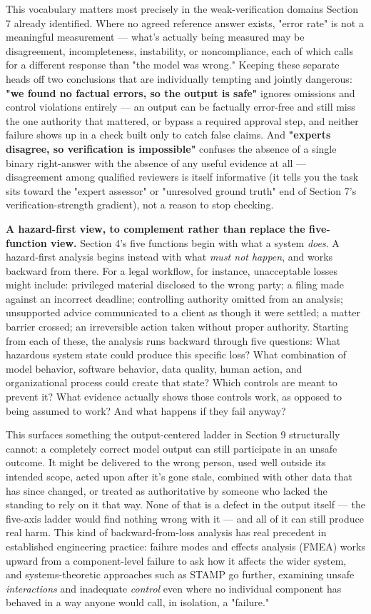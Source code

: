 This vocabulary matters most precisely in the weak-verification domains Section 7 already identified. Where no agreed reference answer exists, "error rate" is not a meaningful measurement --- what's actually being measured may be disagreement, incompleteness, instability, or noncompliance, each of which calls for a different response than "the model was wrong." Keeping these separate heads off two conclusions that are individually tempting and jointly dangerous: \textbf{"we found no factual errors, so the output is safe"} ignores omissions and control violations entirely --- an output can be factually error-free and still miss the one authority that mattered, or bypass a required approval step, and neither failure shows up in a check built only to catch false claims. And \textbf{"experts disagree, so verification is impossible"} confuses the absence of a single binary right-answer with the absence of any useful evidence at all --- disagreement among qualified reviewers is itself informative (it tells you the task sits toward the "expert assessor" or "unresolved ground truth" end of Section 7's verification-strength gradient), not a reason to stop checking.

\textbf{A hazard-first view, to complement rather than replace the five-function view.} Section 4's five functions begin with what a system \emph{does}. A hazard-first analysis begins instead with what \emph{must not happen}, and works backward from there. For a legal workflow, for instance, unacceptable losses might include: privileged material disclosed to the wrong party; a filing made against an incorrect deadline; controlling authority omitted from an analysis; unsupported advice communicated to a client as though it were settled; a matter barrier crossed; an irreversible action taken without proper authority. Starting from each of these, the analysis runs backward through five questions: What hazardous system state could produce this specific loss? What combination of model behavior, software behavior, data quality, human action, and organizational process could create that state? Which controls are meant to prevent it? What evidence actually shows those controls work, as opposed to being assumed to work? And what happens if they fail anyway?

This surfaces something the output-centered ladder in Section 9 structurally cannot: a completely correct model output can still participate in an unsafe outcome. It might be delivered to the wrong person, used well outside its intended scope, acted upon after it's gone stale, combined with other data that has since changed, or treated as authoritative by someone who lacked the standing to rely on it that way. None of that is a defect in the output itself --- the five-axis ladder would find nothing wrong with it --- and all of it can still produce real harm. This kind of backward-from-loss analysis has real precedent in established engineering practice: failure modes and effects analysis (FMEA) works upward from a component-level failure to ask how it affects the wider system, and systems-theoretic approaches such as STAMP go further, examining unsafe \emph{interactions} and inadequate \emph{control} even where no individual component has behaved in a way anyone would call, in isolation, a "failure."
